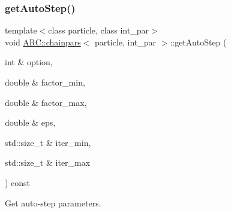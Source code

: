 \subsubsection{\texorpdfstring{get\+Auto\+Step()}{getAutoStep()}}
{\footnotesize\ttfamily template$<$class particle, class int\+\_\+par$>$ \\
void \hyperlink{classARC_1_1chainpars}{A\+R\+C\+::chainpars}$<$ particle, int\+\_\+par $>$\+::get\+Auto\+Step (\begin{DoxyParamCaption}\item[{int \&}]{option,  }\item[{double \&}]{factor\+\_\+min,  }\item[{double \&}]{factor\+\_\+max,  }\item[{double \&}]{eps,  }\item[{std\+::size\+\_\+t \&}]{iter\+\_\+min,  }\item[{std\+::size\+\_\+t \&}]{iter\+\_\+max }\end{DoxyParamCaption}) const\hspace{0.3cm}{\ttfamily [inline]}}



Get auto-\/step parameters. 


